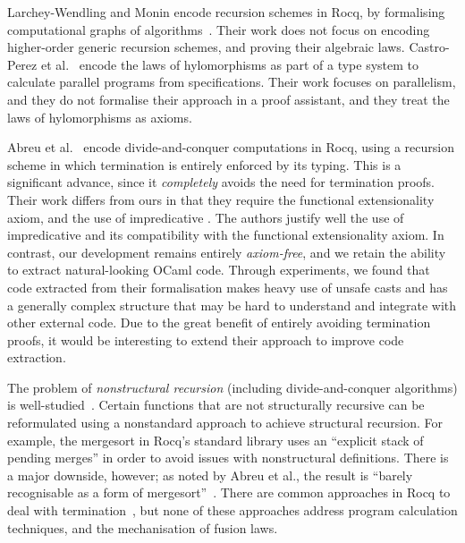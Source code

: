 \documentclass[a4paper,UKenglish,cleveref, autoref, thm-restate]{lipics-v2021}
\newcommand{\mvol}[1]{\textcolor{blue}{\textsc{Michael}: #1}}
\begin{document}
Larchey-Wendling and Monin encode recursion schemes in Rocq,
by formalising computational graphs of algorithms~\cite{larchey2022braga}.
Their work does not focus on encoding higher-order generic recursion schemes,
and proving their algebraic laws. Castro-Perez et al.~\cite{farmsCastro} encode
the laws of hylomorphisms as part of a type system to calculate parallel
programs from specifications. Their work focuses on parallelism, and they do not
formalise their approach in a proof assistant, and they treat the  laws of
hylomorphisms as axioms.

Abreu et al.~\cite{AbreuDHJMS23} encode divide-and-conquer computations in Rocq,
using a recursion scheme in which termination is entirely enforced by its
typing. This is a significant advance, since it \emph{completely} avoids the
need for termination proofs. Their work differs from ours in that they require
the functional extensionality axiom, and the use of impredicative . The
authors justify well the use of impredicative  and its compatibility
with the functional extensionality axiom. In contrast, our development remains
entirely \emph{axiom-free}, and we retain the ability to extract natural-looking
OCaml code.
Through experiments, we found that code extracted from their formalisation makes
heavy use of unsafe casts and has a generally complex structure that may be hard
to understand and integrate with other external code. Due to the great benefit
of entirely avoiding termination proofs, it would be interesting to extend their
approach to improve code extraction.

The problem of \emph{nonstructural recursion} (including
divide-and-conquer algorithms) is well-studied~\cite{BoveKS16}.
Certain functions that are not structurally recursive can be reformulated using
a nonstandard approach to achieve structural recursion.  For example, the
mergesort in Rocq's standard library uses an ``explicit stack of pending merges''
in order to avoid issues with nonstructural definitions. There is a major
downside, however; as noted by Abreu et al., the result is ``barely recognisable
as a form of mergesort''~\cite{AbreuDHJMS23}.  There are common approaches in
Rocq to deal with termination~\cite{DBLP:journals/pacmpl/SozeauM19,
  DBLP:conf/icfp/Sozeau07}, but none of these approaches address program
calculation techniques, and the mechanisation of fusion laws.
\end{document}
